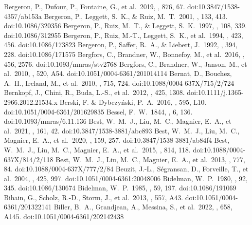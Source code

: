 \documentclass[twocolumn,tighten,twocolappendix]{aastex631}
\begin{document}
\begin{thebibliography}{}
 Bergeron, P., Dufour, P., Fontaine, G., et al.\ 2019, \apj, 876, 67. doi:10.3847/1538-4357/ab153a
 Bergeron, P., Leggett, S.~K., \& Ruiz, M.~T.\ 2001, \apjs, 133, 413. doi:10.1086/320356
 Bergeron, P., Ruiz, M.~T., \& Leggett, S.~K.\ 1997, \apjs, 108, 339. doi:10.1086/312955
 Bergeron, P., Ruiz, M.-T., Leggett, S.~K., et al.\ 1994, \apj, 423, 456. doi:10.1086/173823
 Bergeron, P., Saffer, R.~A., \& Liebert, J.\ 1992, \apj, 394, 228. doi:10.1086/171575
 Bergfors, C., Brandner, W., Bonnefoy, M., et al.\ 2016, \mnras, 456, 2576. doi:10.1093/mnras/stv2768
 Bergfors, C., Brandner, W., Janson, M., et al.\ 2010, \aap, 520, A54. doi:10.1051/0004-6361/201014114
 Bernat, D., Bouchez, A.~H., Ireland, M., et al.\ 2010, \apj, 715, 724. doi:10.1088/0004-637X/715/2/724
 Bernkopf, J., Chini, R., Buda, L.-S., et al.\ 2012, \mnras, 425, 1308. doi:10.1111/j.1365-2966.2012.21534.x
 Berski, F. \& Dybczy{\'n}ski, P.~A.\ 2016, \aap, 595, L10. doi:10.1051/0004-6361/201629835
 Bessel, F.~W.\ 1844, \mnras, 6, 136. doi:10.1093/mnras/6.11.136
 Best, W.~M.~J., Liu, M.~C., Magnier, E.~A., et al.\ 2021, \aj, 161, 42. doi:10.3847/1538-3881/abc893
 Best, W.~M.~J., Liu, M.~C., Magnier, E.~A., et al.\ 2020, \aj, 159, 257. doi:10.3847/1538-3881/ab84f4
 Best, W.~M.~J., Liu, M.~C., Magnier, E.~A., et al.\ 2015, \apj, 814, 118. doi:10.1088/0004-637X/814/2/118
 Best, W.~M.~J., Liu, M.~C., Magnier, E.~A., et al.\ 2013, \apj, 777, 84. doi:10.1088/0004-637X/777/2/84
 Beuzit, J.-L., S{\'e}gransan, D., Forveille, T., et al.\ 2004, \aap, 425, 997. doi:10.1051/0004-6361:20048006
 Bidelman, W.~P.\ 1980, \pasp, 92, 345. doi:10.1086/130674
 Bidelman, W.~P.\ 1985, \apjs, 59, 197. doi:10.1086/191069
 Bihain, G., Scholz, R.-D., Storm, J., et al.\ 2013, \aap, 557, A43. doi:10.1051/0004-6361/201322141
 Biller, B.~A., Grandjean, A., Messina, S., et al.\ 2022, \aap, 658, A145. doi:10.1051/0004-6361/202142438

\end{thebibliography}
\end{document}
